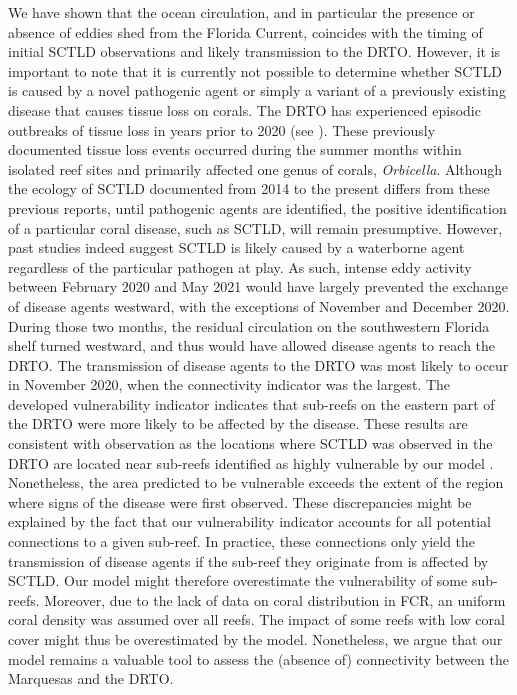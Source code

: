We have shown that the ocean circulation, and in particular the presence or absence of eddies shed from the Florida Current, coincides with the timing of initial SCTLD observations and likely transmission to the DRTO. However, it is important to note that it is currently not possible to determine whether SCTLD is caused by a novel pathogenic agent or simply a variant of a previously existing disease that causes tissue loss on corals. The DRTO has experienced episodic outbreaks of tissue loss in years prior to 2020 (see \citealp{frrp2018}). These previously documented tissue loss events occurred during the summer months within isolated reef sites and primarily affected one genus of corals, \textit{Orbicella}. Although the ecology of SCTLD documented from 2014 to the present differs from these previous reports, until pathogenic agents are identified, the positive identification of a particular coral disease, such as SCTLD, will remain presumptive. However, past studies indeed suggest SCTLD is likely caused by a waterborne agent regardless of the particular pathogen at play. As such, intense eddy activity between February 2020 and May 2021 would have largely prevented the exchange of disease agents westward, with the exceptions of November and December 2020. During those two months, the residual circulation on the southwestern Florida shelf turned westward, and thus would have allowed disease agents to reach the DRTO. The transmission of disease agents to the DRTO was most likely to occur in November 2020, when the connectivity indicator was the largest. The developed vulnerability indicator indicates that sub-reefs on the eastern part of the DRTO were more likely to be affected by the disease. These results are consistent with observation as the locations where SCTLD was observed in the DRTO are located near sub-reefs identified as highly vulnerable by our model \citep{kramer2019map}. Nonetheless, the area predicted to be vulnerable exceeds the extent of the region where signs of the disease were first observed. These discrepancies might be explained by the fact that our vulnerability indicator accounts for all potential connections to a given sub-reef. In practice, these connections only yield the transmission of disease agents if the sub-reef they originate from is affected by SCTLD. Our model might therefore overestimate the vulnerability of some sub-reefs. Moreover, due to the lack of data on coral distribution in FCR, an uniform coral density was assumed over all reefs. The impact of some reefs with low coral cover might thus be overestimated by the model. Nonetheless, we argue that our model remains a valuable tool to assess the (absence of) connectivity between the Marquesas and the DRTO.
 
